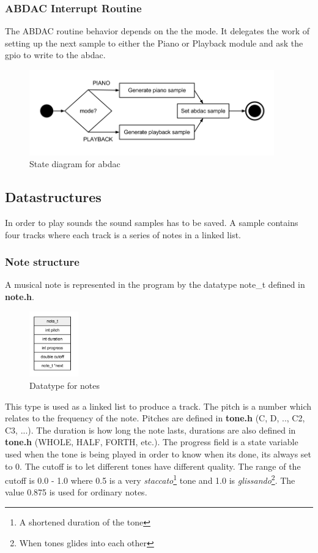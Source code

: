 \subsubsection{ABDAC Interrupt Routine}
The ABDAC routine behavior depends on the the mode. It delegates the work of setting up the next sample
to either the Piano or Playback module and ask the gpio to write to the abdac.

\begin{figure}[h]
  \centerline{\includegraphics[width=400px]{abdac_isr.png}}
  \caption{State diagram for abdac}
\end{figure}


\subsection{Datastructures}

In order to play sounds the sound samples has to be saved. A sample contains four tracks where each track
is a series of notes in a linked list.

\subsubsection{Note structure}
A musical note is represented in the program by the datatype note\_t defined in \textbf{note.h}.
\begin{figure}[h]
  \centerline{\includegraphics[width=80px]{note_t.png}}
  \caption{Datatype for notes}
\end{figure}

This type is used as a linked list to produce a track. The pitch is a number which relates to the frequency
of the note. Pitches are defined in \textbf{tone.h} (C, D, .., C2, C3, ...). The duration is how long the note lasts, durations
are also defined in \textbf{tone.h} (WHOLE, HALF, FORTH, etc.). The progress field is a state variable used
when the tone is being played in order to know when its done, its always set to 0. The cutoff is to let different tones have different
quality. The range of the cutoff is 0.0 - 1.0 where 0.5 is a very \textit{staccato}\footnote{A shortened duration of the tone}
tone and 1.0 is \textit{glissando}\footnote{When tones glides into each other}. The value 0.875 is used
for ordinary notes.

